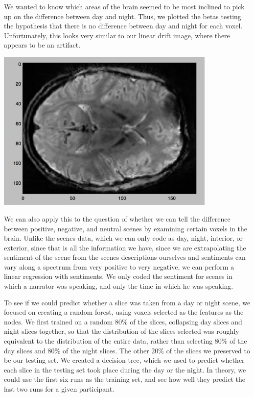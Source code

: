 \documentclass[11pt]{article}
\begin{document}
We wanted to know which areas of the brain seemed to be most inclined to pick
up on the difference between day and night.  Thus, we plotted the betas
testing the hypothesis that there is no difference between day and night for
each voxel.  Unfortunately, this looks very similar to our linear drift image,
where there appears to be an artifact.

\begin{center}
\includegraphics[height=8cm]{7}
\end{center}

We can also apply this to the question of whether we can tell the difference
between positive, negative, and neutral scenes by examining certain voxels in
the brain. Unlike the scenes data, which we can only code as day, night,
interior, or exterior, since that is all the information we have, since we are
extrapolating the sentiment of the scene from the scenes descriptions
ourselves and sentiments can vary along a spectrum from very positive to very
negative, we can perform a linear regression with sentiments.  We only coded
the sentiment for scenes in which a narrator was speaking, and only the time
in which he was speaking.

To see if we could predict whether a slice was taken from a day or night
scene, we focused on creating a random forest, using voxels selected as the
features as the nodes.  We first trained on a random 80\% of the slices,
collapsing day slices and night slices together, so that the distribution of
the slices selected was roughly equivalent to the distribution of the entire
data, rather than selecting 80\% of the day slices and 80\% of the night
slices.  The other 20\% of the slices we preserved to be our testing set.  We
created a decision tree, which we used to predict whether each slice in the
testing set took place during the day or the night.  In theory, we could use
the first six runs as the training set, and see how well they predict the last
two runs for a given participant.
\end{document}
